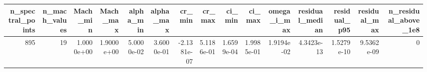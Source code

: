\begin{tabular}{rrrrrrrrrrrrrrr}
\toprule
n_spectral_points & n_mach_values & Mach_min & Mach_max & alpha_min & alpha_max & cr_min & cr_max & ci_min & ci_max & omega_i_max & residual_median & residual_p95 & residual_max & n_residual_above_1e8 \\
\midrule
895 & 19 & 1.0000e+00 & 1.9000e+00 & 5.0000e-02 & 3.6000e-01 & -2.1381e-07 & 5.1186e-01 & 1.6599e-04 & 1.9985e-01 & 1.9194e-02 & 4.3423e-13 & 1.5279e-10 & 9.5362e-09 & 0 \\
\bottomrule
\end{tabular}
